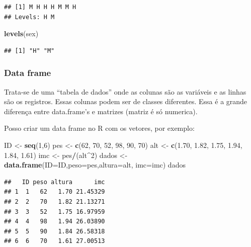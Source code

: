 \documentclass[
]{book}
\newenvironment{Shaded}{\begin{snugshade}}{\end{snugshade}}
\newcommand{\DataTypeTok}[1]{\textcolor[rgb]{0.13,0.29,0.53}{#1}}
\newcommand{\DecValTok}[1]{\textcolor[rgb]{0.00,0.00,0.81}{#1}}
\newcommand{\FloatTok}[1]{\textcolor[rgb]{0.00,0.00,0.81}{#1}}
\newcommand{\KeywordTok}[1]{\textcolor[rgb]{0.13,0.29,0.53}{\textbf{#1}}}
\newcommand{\NormalTok}[1]{#1}
\newcommand{\OperatorTok}[1]{\textcolor[rgb]{0.81,0.36,0.00}{\textbf{#1}}}
\newcommand{\StringTok}[1]{\textcolor[rgb]{0.31,0.60,0.02}{#1}}
\begin{document}
\begin{verbatim}
## [1] M H H H M M H
## Levels: H M
\end{verbatim}

\begin{Shaded}
\begin{Highlighting}[]
\KeywordTok{levels}\NormalTok{(sex)}
\end{Highlighting}
\end{Shaded}

\begin{verbatim}
## [1] "H" "M"
\end{verbatim}

\hypertarget{data-frame}{%
\subsubsection{Data frame}\label{data-frame}}

Trata-se de uma ``tabela de dados'' onde as colunas são as variáveis e as linhas são os registros. Essas colunas podem ser de classes diferentes.
Essa é a grande diferença entre data.frame's e matrizes (matriz é só numerica).

Posso criar um data frame no R com os vetores, por exemplo:

\begin{Shaded}
\begin{Highlighting}[]
\NormalTok{ID <-}\StringTok{ }\KeywordTok{seq}\NormalTok{(}\DecValTok{1}\NormalTok{,}\DecValTok{6}\NormalTok{)}
\NormalTok{pes <-}\StringTok{ }\KeywordTok{c}\NormalTok{(}\DecValTok{62}\NormalTok{, }\DecValTok{70}\NormalTok{, }\DecValTok{52}\NormalTok{, }\DecValTok{98}\NormalTok{, }\DecValTok{90}\NormalTok{, }\DecValTok{70}\NormalTok{)}
\NormalTok{alt <-}\StringTok{ }\KeywordTok{c}\NormalTok{(}\FloatTok{1.70}\NormalTok{, }\FloatTok{1.82}\NormalTok{, }\FloatTok{1.75}\NormalTok{, }\FloatTok{1.94}\NormalTok{, }\FloatTok{1.84}\NormalTok{, }\FloatTok{1.61}\NormalTok{)}
\NormalTok{imc <-}\StringTok{ }\NormalTok{pes}\OperatorTok{/}\NormalTok{(alt}\OperatorTok{^}\DecValTok{2}\NormalTok{)}
\NormalTok{dados <-}\StringTok{ }\KeywordTok{data.frame}\NormalTok{(}\DataTypeTok{ID=}\NormalTok{ID,}\DataTypeTok{peso=}\NormalTok{pes,}\DataTypeTok{altura=}\NormalTok{alt, }\DataTypeTok{imc=}\NormalTok{imc)}
\NormalTok{dados}
\end{Highlighting}
\end{Shaded}

\begin{verbatim}
##   ID peso altura      imc
## 1  1   62   1.70 21.45329
## 2  2   70   1.82 21.13271
## 3  3   52   1.75 16.97959
## 4  4   98   1.94 26.03890
## 5  5   90   1.84 26.58318
## 6  6   70   1.61 27.00513
\end{verbatim}
\end{document}
